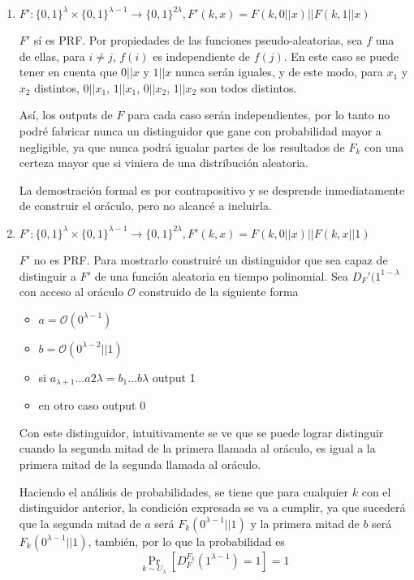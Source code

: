 \documentclass[twoside]{tareas}
\begin{document}
\begin{enumerate}
    \item {\boldmath$F': \{0, 1\}^{\lambda} \times \{0, 1\}^{\lambda-1} \rightarrow \{0, 1\}^{2\lambda}, F'(k, x) = F (k, 0||x)||F (k, 1||x)$}

    $F'$ sí es PRF. Por propiedades de las funciones pseudo-aleatorias, sea $f$ una de ellas, para $i \neq j$, $f(i)$ es independiente de $f(j)$. En este caso se puede tener en cuenta que $0||x$ y $1||x$ nunca serán iguales, y de este modo, para $x_1$ y $x_2$ distintos, $0||x_1$, $1||x_1$, $0||x_2$, $1||x_2$ son todos distintos.

    Así, los outputs de $F$ para cada caso serán independientes, por lo tanto no podré fabricar nunca un distinguidor que gane con probabilidad mayor a negligible, ya que nunca podrá igualar partes de los resultados de $F_k$ con una certeza mayor que si viniera de una distribución aleatoria.

    La demostración formal es por contrapositivo y se desprende inmediatamente de construir el oráculo, pero no alcancé a incluirla.

    \item {\boldmath$F': \{0, 1\}^{\lambda} \times \{0, 1\}^{\lambda-1} \rightarrow \{0, 1\}^{2\lambda}, F'(k, x) = F (k, 0||x)||F (k, x||1)$}

    $F'$ no es PRF. Para mostrarlo construiré un distinguidor que sea capaz de distinguir a $F'$ de una función aleatoria en tiempo polinomial. Sea $D_F'(1^{1-\lambda}$ con acceso al oráculo $\mathcal{O}$ construido de la siguiente forma

    \begin{itemize}
        \item $a = \mathcal{O}(0^{\lambda - 1})$
        \item $b = \mathcal{O}(0^{\lambda - 2} || 1)$
        \item si $a_{\lambda + 1}...a{2\lambda} = b_{1}...b{\lambda}$ output 1
        \item en otro caso output 0
    \end{itemize}

    Con este distinguidor, intuitivamente se ve que se puede lograr distinguir cuando la segunda mitad de la primera llamada al oráculo, es igual a la primera mitad de la segunda llamada al oráculo.

    Haciendo el análisis de probabilidades, se tiene que para cualquier $k$ con el distinguidor anterior, la condición expresada se va a cumplir, ya que sucederá que la segunda mitad de $a$ será $F_k(0^{\lambda - 1} || 1)$ y la primera mitad de $b$ será $F_k(0^{\lambda - 1} || 1)$, también, por lo que la probabilidad es
    $$\Pr_{k \sim U_\lambda}[D_F^{F_k}(1^{\lambda-1}) = 1] = 1$$


\end{enumerate}
\end{document}
